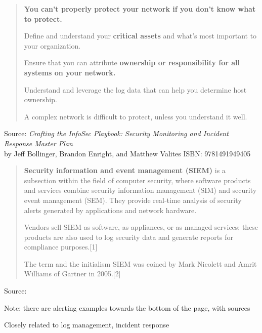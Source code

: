 \documentclass[Screen16to9,17pt]{foils}
\begin{document}


\begin{quote}
\begin{list2}
\item {\bf You can’t properly protect your network if you don’t know what to protect.}
\item Define and understand your {\bf critical assets} and what’s most important to your
  organization.
\item Ensure that you can attribute {\bf ownership or responsibility for all systems on your
  network.}
\item Understand and leverage the log data that can help you determine host ownership.
\item A complex network is difficult to protect, unless you understand it well.
\end{list2}
\end{quote}

Source:
 \emph{Crafting the InfoSec Playbook: Security Monitoring and Incident Response Master Plan}\\
 by Jeff Bollinger, Brandon Enright, and Matthew Valites ISBN: 9781491949405




\begin{quote}
{\bf Security information and event management (SIEM)} is a subsection within the field of computer security, where software products and services combine security information management (SIM) and security event management (SEM). They provide real-time analysis of security alerts generated by applications and network hardware.

  Vendors sell SIEM as software, as appliances, or as managed services; these products are also used to log security data and generate reports for compliance purposes.[1]

  The term and the initialism SIEM was coined by Mark Nicolett and Amrit Williams of Gartner in 2005.[2]
\end{quote}
Source: 

\begin{list2}
  \item Note: there are alerting examples towards the bottom of the page, with sources
  \item Closely related to log management, incident response
\end{list2}
\end{document}

